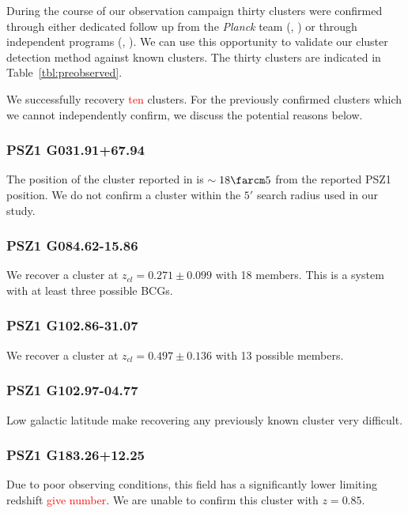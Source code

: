 \documentclass[apj, revtex4]{emulateapj}
\newcommand{\editorial}[1]{\textcolor{red}{#1}}
\begin{document}
During the course of our observation campaign thirty clusters were confirmed through either dedicated follow up from the \textit{Planck} team (\eg, \citealt{PlanckCollaboration2015, PlanckCollaboration2016a}) or through independent programs (\eg, \citealt{Liu2015a, VanderBurg2016, Burenin2017, Burenin2018, Amodeo2018, Barrena2018, Streblyanska2018}). We can use this opportunity to validate our cluster detection method against known clusters. The thirty clusters are indicated in Table~\ref{tbl:preobserved}.

We successfully recovery \editorial{ten} clusters. For the previously confirmed clusters which we cannot independently confirm, we discuss the potential reasons below.

\subsubsection{PSZ1 G031.91+67.94}

The position of the cluster reported in \cite{PlanckCollaboration2016a} is $\sim18\farcm5$ from the reported PSZ1 position. We do not confirm a cluster within the $5'$ search radius used in our study.

\subsubsection{PSZ1 G084.62-15.86}
We recover a cluster at $z_{cl} = 0.271 \pm 0.099$ with 18 members. This is a system with at least three possible BCGs.

\subsubsection{PSZ1 G102.86-31.07}
We recover a cluster at $z_{cl} = 0.497 \pm 0.136$ with 13 possible members.

\subsubsection{PSZ1 G102.97-04.77}
Low galactic latitude make recovering any previously known cluster very difficult.

\subsubsection{PSZ1 G183.26+12.25}
Due to poor observing conditions, this field has a significantly lower limiting redshift \editorial{give number}. We are unable to confirm this cluster with $z=0.85.$
\end{document}
